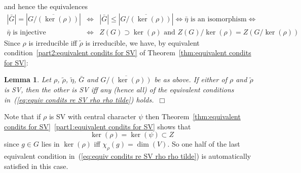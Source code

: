 \documentclass[12pt]{article}
\newtheorem{lemma}{Lemma}[section]
\newcommand{\ePf}{~$\Box$\vertsp\par}%
\renewcommand{\t}[1]{\tilde{#1}}
\newcommand{\vertsp}{\vspace{1ex}}
\begin{document}
and hence the equivalences 
\begin{eqnarray}
|\bar G|=|\overline{G/(\ker(\rho))}|&\Longleftrightarrow&
|\bar G|\leq |\overline{G/(\ker(\rho))}|\Longleftrightarrow
\mbox{$\bar \eta$ is an isomorphism} \Longleftrightarrow\nonumber\\
\mbox{$\bar \eta$ is injective} &\Longleftrightarrow&
\mbox{$Z(G)\supset\ker (\rho)$ and $Z(G)/\ker(\rho)=Z(G/\ker(\rho))$}
\label{eq:equiv condits re SV rho rho tilde}
\end{eqnarray}
Since $\rho$ is irreducible iff $\t \rho$ is irreducible, we have, by equivalent condition~\ref{part2:equivalent condits for SV} of 
Theorem~\ref{thm:equivalent condits for SV}:
\begin{lemma}\label{lemma:when rho and tilderho are SV}
	Let $\rho$, $\t \rho$, $\t \eta$, $\bar G$ and $\overline{G/(\ker(\rho))}$ be as above. If either of $\rho$ and $\t \rho$ is SV, then the other is SV iff any (hence all) of the equivalent conditions in~(\ref{eq:equiv condits re SV rho rho tilde}) holds.\ePf
\end{lemma}
Note that if $\rho$ is SV with central character $\psi$ then Theorem~\ref{thm:equivalent condits for SV}~\ref{part1:equivalent condits for SV} shows that
\begin{equation}\label{eq:ker of SV rep is ker of central char}
	\ker(\rho)=\ker(\psi)\subset Z
\end{equation}
since  $g\in G$ lies in $\ker(\rho)$ iff $\chi_\rho(g)=\dim(V)$. So one half of the last equivalent condition in~(\ref{eq:equiv condits re SV rho rho tilde}) is automatically satisfied in this case. 
\end{document}
